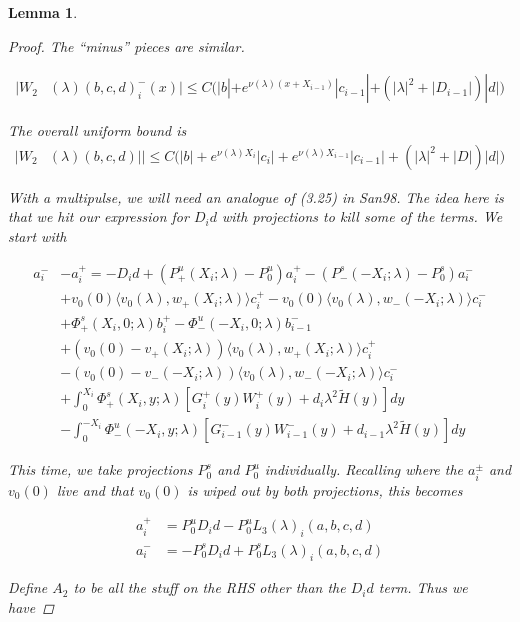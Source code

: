 \documentclass[12pt]{article}
\newtheorem{lemma}{Lemma}
\begin{document}
\begin{lemma}
\begin{proof}
The ``minus'' pieces are similar.

\begin{align*}
|W_2&(\lambda)(b,c,d)_i^-(x)| 
\leq C \Big( |b| + e^{\nu(\lambda)(x + X_{i-1})}|c_{i-1}| + (|\lambda|^2 + |D_{i-1}|)|d| \Big)
\end{align*}

The overall uniform bound is
\begin{align*}
|W_2&(\lambda)(b,c,d)|| 
\leq C \Big( |b| + e^{\nu(\lambda)X_i}|c_i| + e^{\nu(\lambda)X_{i-1}}|c_{i-1}| + (|\lambda|^2 + |D|)|d| \Big)
\end{align*}

With a multipulse, we will need an analogue of (3.25) in San98. The idea here is that we hit our expression for $D_i d$ with projections to kill some of the terms. We start with

\begin{align*}
a_i^- &- a_i^+ = -D_i d + (P^u_+(X_i; \lambda) - P_0^u)a_i^+ - (P^s_-(-X_i; \lambda) - P_0^s)a_i^- \\
&+ v_0(0) \langle v_0(\lambda), w_+(X_i; \lambda) \rangle c_i^+ 
- v_0(0) \langle v_0(\lambda), w_-(-X_i; \lambda) \rangle c_i^- \\
&+ \Phi^s_+(X_i, 0; \lambda)b_i^+ - \Phi^u_-(-X_i, 0; \lambda)b_{i-1}^- \\
&+ (v_0(0) - v_+(X_i; \lambda)) \langle v_0(\lambda), w_+(X_i; \lambda) \rangle c_i^+ \\
&- (v_0(0) - v_-(-X_i; \lambda)) \langle v_0(\lambda), w_-(-X_i; \lambda) \rangle c_i^- \\
&+ \int_0^{X_i} \Phi^s_+(X_i, y; \lambda) [ G_i^+(y) W_i^+(y) + d_i \lambda^2 \tilde{H}(y) ] dy \\
&- \int_0^{-X_i} \Phi^u_-(-X_i, y; \lambda) [ G_{i-1}^-(y) W_{i-1}^-(y) + d_{i-1} \lambda^2 \tilde{H}(y) ] dy 
\end{align*}

This time, we take projections $P^s_0$ and $P^u_0$ individually. Recalling where the $a_i^\pm$ and $v_0(0)$ live and that $v_0(0)$ is wiped out by both projections, this becomes 

\begin{align*}
a_i^+ &= P^u_0 D_i d - P^u_0 L_3(\lambda)_i(a, b, c, d) \\
a_i^- &= -P^s_0 D_i d + P^s_0 L_3(\lambda)_i(a, b, c, d)
\end{align*}

Define $A_2$ to be all the stuff on the RHS other than the $D_i d$ term. Thus we have 


\end{proof}
\end{lemma}
\end{document}
